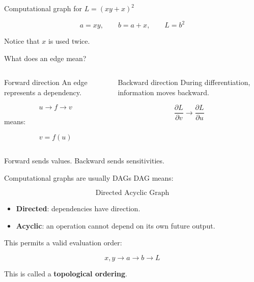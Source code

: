 \documentclass[10pt,aspectratio=169]{beamer}
\newcommand{\grad}[2]{\frac{\partial #1}{\partial #2}}
\begin{document}
\begin{frame}[t]{Computational graph for \(L=(xy+x)^2\)}
\centering


\vspace{0.35cm}

\[
a=xy,\qquad b=a+x,\qquad L=b^2
\]

Notice that \(x\) is used twice.
\end{frame}

\begin{frame}[t]{What does an edge mean?}
\begin{columns}[T]
\begin{block}{Forward direction}
An edge represents a dependency.

\[
u \rightarrow f \rightarrow v
\]

means:

\[
v=f(u)
\]
\end{block}

\begin{block}{Backward direction}
During differentiation, information moves backward.

\[
\grad{L}{v}
\rightarrow
\grad{L}{u}
\]
\end{block}
\end{columns}

\vfill

Forward sends values.  
Backward sends sensitivities.
\end{frame}

\begin{frame}[t]{Computational graphs are usually DAGs}
DAG means:

\[
\boxed{\text{Directed Acyclic Graph}}
\]

\begin{itemize}
    \item \textbf{Directed}: dependencies have direction.
    \item \textbf{Acyclic}: an operation cannot depend on its own future output.
\end{itemize}

This permits a valid evaluation order:

\[
x,y
\rightarrow
a
\rightarrow
b
\rightarrow
L
\]

This is called a \textbf{topological ordering}.
\end{frame}
\end{document}
